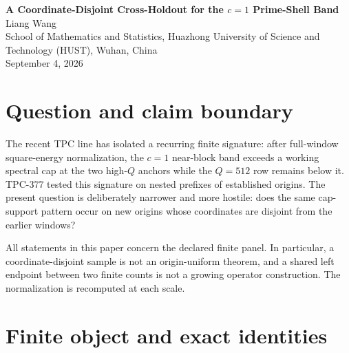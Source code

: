 \documentclass[10pt]{article}
\begin{document}
\small

\begin{center}
{\Large\bf A Coordinate-Disjoint Cross-Holdout for the $c=1$ Prime-Shell Band}\\[5pt]
Liang Wang\\
School of Mathematics and Statistics, Huazhong University of Science and
Technology (HUST), Wuhan, China\\
September 4, 2026
\end{center}

\begin{abstract}
TPC-377 found that a finite $c=1$ prime-shell band retained its high-$Q$
failure support across a nested count ladder.  This paper tests whether the
support transfers to a fresh, coordinate-disjoint origin family.  We freeze
an affine grid, select three indices before reading any response, and evaluate
the endpoint counts $N=1024,2048$ at $Q=512,2048,8192$, giving 18 rows.  The
complete band profile is $(0,3,3)$ at both counts: 12 of 18 rows exceed the
spectral cap and none exceed the Schur cap.  Selected full-mode absolute
Rayleigh retention ranges from $0.93759972206138864$ to
$0.98046528117382914$.  This is finite response-blind support-transfer
evidence only; it does not prove origin or scale uniformity, an asymptotic
operator bound, an arithmetic estimate, or a twin-prime theorem.
\end{abstract}

\section{Question and claim boundary}

The recent TPC line has isolated a recurring finite signature: after
full-window square-energy normalization, the $c=1$ near-block band exceeds a
working spectral cap at the two high-$Q$ anchors while the $Q=512$ row remains
below it.  TPC-377 tested this signature on nested prefixes of established
origins.  The present question is deliberately narrower and more hostile:
does the same cap-support pattern occur on new origins whose coordinates are
disjoint from the earlier windows?

All statements in this paper concern the declared finite panel.  In
particular, a coordinate-disjoint sample is not an origin-uniform theorem,
and a shared left endpoint between two finite counts is not a growing
operator construction.  The normalization is recomputed at each scale.

\section{Finite object and exact identities}
\end{document}
